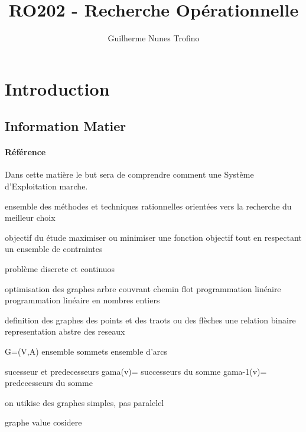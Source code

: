 \documentclass{article}
\title{RO202 - Recherche Opérationnelle}
\author{Guilherme Nunes Trofino}
\begin{document}
\maketitle
\setlength{\parindent}{0pt}

\newpage\tableofcontents

\section{Introduction}
% 
% 

% 

\subsection{Information Matier}
\paragraph{Référence}Dans cette matière le but sera de comprendre comment une Système d'Exploitation marche.

ensemble des méthodes et techniques rationnelles orientées vers la recherche du meilleur choix


objectif du étude
maximiser ou minimiser une fonction objectif tout en respectant un ensemble de contraintes

problème discrete et continuos

optimisation des graphes
    arbre couvrant
    chemin
    flot
programmation linéaire
programmation linéaire
    en nombres entiers


definition des graphes
    des points et des traots ou des flèches
    une relation binaire
    representation abstre des reseaux

    G=(V,A)
        ensemble sommets
        ensemble d'arcs

        sucesseur et predecesseurs
        gama(v)= {successeurs du somme}
        gama-1(v)= {predecesseurs du somme}

    on utikise des graphes simples, pas paralelel

    graphe value cosidere
\end{document}
